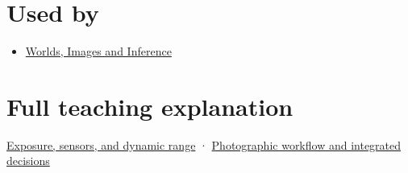 \section{Used by}\label{appendix-92d45cdf2afc-used-by}

\begin{itemize}
\tightlist
\item
  \href{Continuous\%20Notes/University\%20-\%20Worlds,\%20Images\%20and\%20Inference\%20-\%20Graphics,\%20Vision\%20and\%20Photography}{Worlds, Images and Inference}
\end{itemize}

\section{Full teaching explanation}\label{appendix-92d45cdf2afc-full-teaching-explanation}

\href{Continuous\%20Notes/University\%20-\%20Worlds,\%20Images\%20and\%20Inference\%20-\%20Graphics,\%20Vision\%20and\%20Photography\#Exposure,\%20sensors,\%20and\%20dynamic\%20range}{Exposure, sensors, and dynamic range} · \href{Continuous\%20Notes/University\%20-\%20Worlds,\%20Images\%20and\%20Inference\%20-\%20Graphics,\%20Vision\%20and\%20Photography\#Photographic\%20workflow\%20and\%20integrated\%20decisions}{Photographic workflow and integrated decisions}
